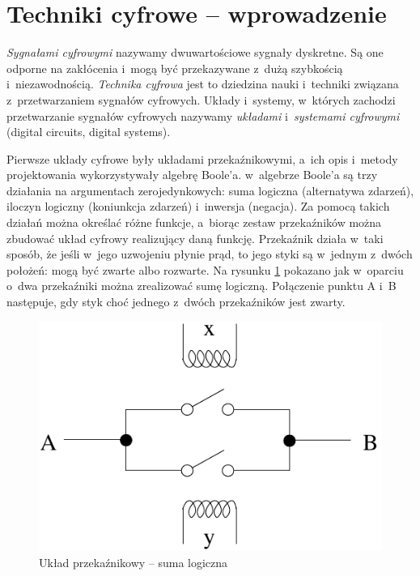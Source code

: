 \documentclass[a4paper,11pt]{article}
\begin{document}
\section*{Techniki cyfrowe -- wprowadzenie}

\emph{Sygnałami cyfrowymi} nazywamy dwuwartościowe sygnały dyskretne. Są one odporne na zakłócenia i~mogą być przekazywane z~dużą szybkością i~niezawodnością. \emph{Technika cyfrowa} jest to dziedzina nauki i~techniki związana z~przetwarzaniem sygnałów cyfrowych. Układy i~systemy, w~których zachodzi przetwarzanie sygnałów cyfrowych nazywamy \emph{układami} i~\emph{systemami cyfrowymi} (digital circuits, digital systems).


Pierwsze układy cyfrowe były układami przekaźnikowymi, a~ich opis i~metody projektowania wykorzystywały algebrę Boole'a. w~algebrze Boole'a są trzy działania na argumentach zerojedynkowych: suma logiczna (alternatywa zdarzeń), iloczyn logiczny (koniunkcja zdarzeń) i~inwersja (negacja). Za pomocą takich działań można określać różne funkcje, a~biorąc zestaw przekaźników można zbudować układ cyfrowy realizujący daną funkcję. Przekaźnik działa w~taki sposób, że jeśli w~jego uzwojeniu płynie prąd, to jego styki są w~jednym z~dwóch położeń: mogą być zwarte albo rozwarte. Na rysunku \ref{fig:ukladPrzekaznikowy} pokazano jak w~oparciu o~dwa przekaźniki można zrealizować sumę logiczną. Połączenie punktu A i~B następuje, gdy styk choć jednego z~dwóch przekaźników jest zwarty.


\begin{figure}[!htb]
\centerline{\includegraphics[scale=0.6]{uklad-przekaznikowy.pdf}}
\caption{Układ przekaźnikowy – suma logiczna}
\label{fig:ukladPrzekaznikowy}
\end{figure}
\end{document}
